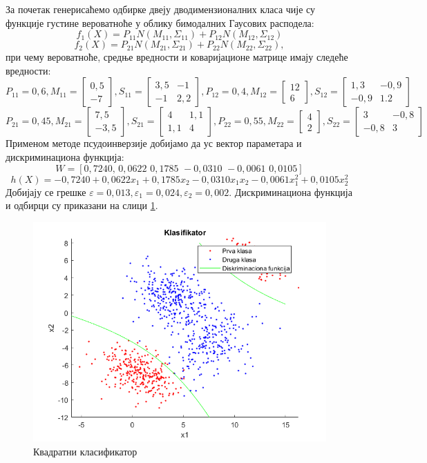 За почетак генерисаћемо одбирке двеју дводимензионалних класа чије су функције густине вероватноће у облику бимодалних Гаусових расподела:
\\
$$f_1(X) = P_{11} N(M_{11}, \Sigma_{11}) + P_{12} N(M_{12}, \Sigma_{12})$$
$$f_2(X) = P_{21} N(M_{21}, \Sigma_{21}) + P_{22} N(M_{22}, \Sigma_{22}),$$
при чему вероватноће, средње вредности и коваријационе матрице имају следеће вредности:
$$P_{11} = 0,6,  M_{11} = \begin{bmatrix}
   0,5\\
   -7
\end{bmatrix}, 
S_{11} = \begin{bmatrix}
				   3,5 & -1\\
				   -1 & 2,2
				\end{bmatrix},
P_{12} = 0,4,  M_{12} = \begin{bmatrix}
										   12\\
										   6
										\end{bmatrix}, 
S_{12} = \begin{bmatrix}
				   1,3 & -0,9\\
			   	-0,9 &  1.2
				\end{bmatrix}
$$				
$$P_{21} = 0,45,  M_{21} = \begin{bmatrix}
   7,5\\
   -3,5
\end{bmatrix}, 
S_{21} = \begin{bmatrix}
				   4 & 1,1\\
				   1,1 & 4
				\end{bmatrix},
P_{22} = 0,55,  M_{22} = \begin{bmatrix}
										   4\\
										   2
										\end{bmatrix}, 
S_{22} = \begin{bmatrix}
				   3 & -0,8\\
			   	-0,8 &  3
				\end{bmatrix}
$$
Применом методе псудоинверзије добијамо да ус вектор параметара и дискриминациона функција:
$$W = [0,7240,\,0,0622\,\,0,1785\,\, -0,0310\,\, -0,0061\,\, 0,0105]$$
$$h(X) = -0,7240 +0,0622x_1+0,1785x_2 -0,0310x_1x_2 -0,0061x_1^2 +0,0105x_2^2$$
Добијају се грешке $\varepsilon=0,013, \varepsilon_1 = 0,024, \varepsilon_2=0,002$. Дискриминациона функција и одбирци су приказани на слици \ref{fig:quadClass}.

\begin{figure}[htb!]
\centering
\includegraphics[scale=1]{pictures/3/QuadClass}
\caption{Квадратни класификатор}\label{fig:quadClass}
\end{figure}